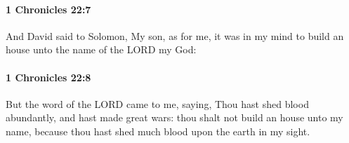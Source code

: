 		\paragraph{1 Chronicles 22:7} %
			\label{1CHRONICLES-22-7}

			And David said to Solomon, My son, as for me, it was in my mind to build an house unto the name of the LORD my God:


		\paragraph{1 Chronicles 22:8} %
			\label{1CHRONICLES-22-8}

			But the word of the LORD came to me, saying, Thou hast shed blood abundantly, and hast made great wars: thou shalt not build an house unto my name, because thou hast shed much blood upon the earth in my sight.



